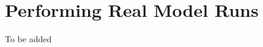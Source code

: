 \documentclass[main.tex]{subfiles}
\begin{document}
\setcounter{section}{3}
\section{Performing Real Model Runs}

To be added
\end{document}

